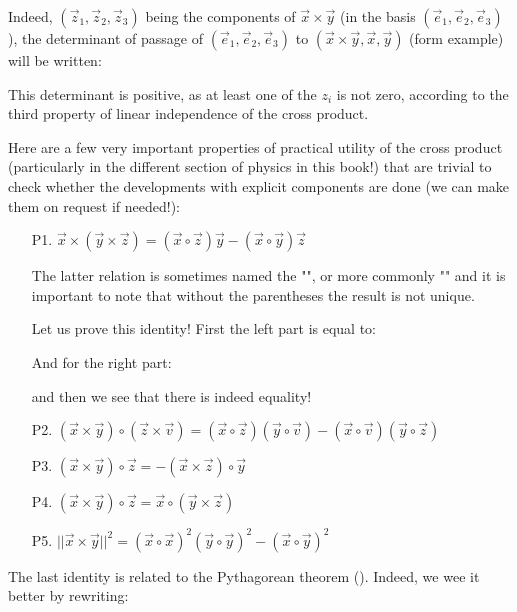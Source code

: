 	Indeed, $(\vec{z}_1,\vec{z}_2,\vec{z}_3)$ being the components of $\vec{x}\times \vec{y}$ (in the basis $(\vec{e}_1,\vec{e}_2,\vec{e}_3)$), the determinant of passage of $(\vec{e}_1,\vec{e}_2,\vec{e}_3)$ to $(\vec{x}\times \vec{y},\vec{x},\vec{y})$ (form example) will be written:
	 
	 This determinant is positive, as at least one of the $z_i$ is not zero, according to the third property of linear independence of the cross product.
	 
	 Here are a few very important properties of practical utility of the cross product (particularly in the different section of physics in this book!) that are trivial to check whether the developments with explicit components are done (we can make them on request if needed!):
	\begin{enumerate}
		\item[P1.] $\vec{x}\times(\vec{y}\times\vec{z})=(\vec{x}\circ\vec{z})\vec{y}-(\vec{x}\circ\vec{y})\vec{z}$
		\begin{tcolorbox}[title=Remark,colframe=black,arc=10pt]
		The latter relation is sometimes named the "\label{grassman rule}", or more commonly "" and it is important to note that without the parentheses the result is not unique.
		\end{tcolorbox}	
		Let us prove this identity! First the left part is equal to:
		
		And for the right part:
		
		and then we see that there is indeed equality!
		\item[P2.] $(\vec{x}\times\vec{y})\circ (\vec{z}\times\vec{v})=(\vec{x}\circ\vec{z})(\vec{y}\circ\vec{v})-(\vec{x}\circ\vec{v})(\vec{y}\circ\vec{z})$
		
		\item[P3.] $(\vec{x}\times\vec{y})\circ\vec{z}=-(\vec{x}\times\vec{z})\circ \vec{y}$
		
		\item[P4.] $(\vec{x}\times\vec{y})\circ\vec{z}=\vec{x}\circ(\vec{y}\times\vec{z})$
		
		\item[P5.] $||\vec{x}\times\vec{y}||^2=(\vec{x}\circ\vec{x})^2(\vec{y}\circ\vec{y})^2-(\vec{x}\circ\vec{y})^2$
	\end{enumerate}
	The last identity is related to the Pythagorean theorem (). Indeed, we wee it better by rewriting:
	
